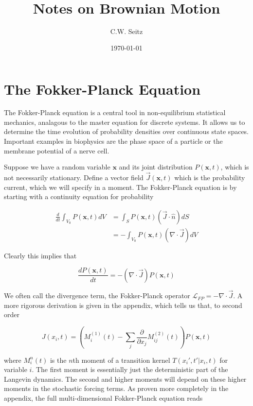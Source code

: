 \documentclass{article}
\title{Notes on Brownian Motion}
\author{C.W. Seitz}
\date{\today}
\begin{document}
\maketitle


\section{The Fokker-Planck Equation}

The Fokker-Planck equation is a central tool in non-equilibrium statistical mechanics, analagous to the master equation for discrete systems. It allows us to determine the time evolution of probability densities over continuous state spaces. Important examples in biophysics are the phase space of a particle or the membrane potential of a nerve cell.

Suppose we have a random variable $\bm{x}$ and its joint distribution $P(\bm{x},t)$, which is not necessarily stationary. Define a vector field $\vec{J}(\bm{x},t)$ which is the probability current, which we will specify in a moment. The Fokker-Planck equation is by starting with a continuity equation for probability 

\begin{align*}
\frac{d}{dt}\int_{V_{0}} P(\bm{x},t)dV &= \int_{S}P(\bm{x},t)(\vec{J}\cdot\hat{n})dS\\
&= -\int_{V_{0}}P(\bm{x},t)(\nabla\cdot \vec{J})dV
\end{align*}

Clearly this implies that

\begin{equation*}
\frac{dP(\bm{x},t)}{dt} = -\left(\nabla\cdot \vec{J}\right)P(\bm{x},t)
\end{equation*}

We often call the divergence term, the Fokker-Planck operator $\mathcal{L}_{FP}=-\nabla\cdot \vec{J}$. A more rigorous derivation is given in the appendix, which tells us that, to second order

\begin{equation*}
J(x_{i},t)  = \left(M_{i}^{(1)}(t) - \sum_{j}\frac{\partial}{\partial x_{j}}M_{ij}^{(2)}(t) \right)P(\bm{x},t)
\end{equation*}

where $M_{i}^{n}(t)$ is the $n$th moment of a transition kernel $T(x_{i}',t'|x_{i},t)$ for variable $i$. The first moment is essentially just the deterministic part of the Langevin dynamics. The second and higher moments will depend on these higher moments in the stochastic forcing terms. As proven more completely in the appendix, the full multi-dimensional Fokker-Planck equation reads
\end{document}
